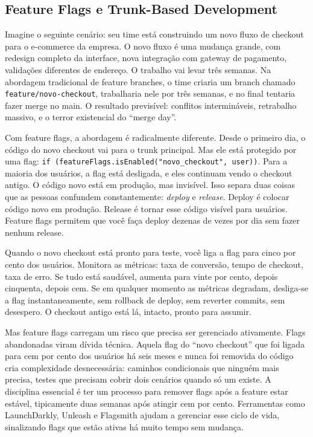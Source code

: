\subsection{Feature Flags e Trunk-Based Development}

Imagine o seguinte cenário: seu time está construindo um novo fluxo de checkout
para o e-commerce da empresa. O novo fluxo é uma mudança grande, com redesign
completo da interface, nova integração com gateway de pagamento, validações
diferentes de endereço. O trabalho vai levar três semanas. Na abordagem tradicional
de feature branches, o time criaria um branch chamado \texttt{feature/novo-checkout},
trabalharia nele por três semanas, e no final tentaria fazer merge no main.
O resultado previsível: conflitos intermináveis, retrabalho massivo, e o terror
existencial do ``merge day''.

Com feature flags, a abordagem é radicalmente diferente. Desde o primeiro dia,
o código do novo checkout vai para o trunk principal. Mas ele está protegido
por uma flag: \texttt{if (featureFlags.isEnabled("novo\_checkout", user))}. Para
a maioria dos usuários, a flag está desligada, e eles continuam vendo o checkout
antigo. O código novo está em produção, mas invisível. Isso separa duas coisas que
as pessoas confundem constantemente: \emph{deploy} e \emph{release}. Deploy é colocar
código novo em produção. Release é tornar esse código visível para usuários.
Feature flags permitem que você faça deploy dezenas de vezes por dia sem fazer
nenhum release.

Quando o novo checkout está pronto para teste, você liga a flag para cinco por
cento dos usuários. Monitora as métricas: taxa de conversão, tempo de checkout,
taxa de erro. Se tudo está saudável, aumenta para vinte por cento, depois
cinquenta, depois cem. Se em qualquer momento as métricas degradam, desliga-se
a flag instantaneamente, sem rollback de deploy, sem reverter commits, sem
desespero. O checkout antigo está lá, intacto, pronto para assumir.

Mas feature flags carregam um risco que precisa ser gerenciado ativamente. Flags
abandonadas viram dívida técnica. Aquela flag do ``novo checkout'' que foi ligada
para cem por cento dos usuários há seis meses e nunca foi removida do código cria
complexidade desnecessária: caminhos condicionais que ninguém mais precisa,
testes que precisam cobrir dois cenários quando só um existe. A
disciplina essencial é ter um processo para remover flags após a feature estar
estável, tipicamente duas semanas após atingir cem por cento. Ferramentas
como LaunchDarkly, Unleash e Flagsmith ajudam a gerenciar esse ciclo de vida,
sinalizando flags que estão ativas há muito tempo sem mudança.

